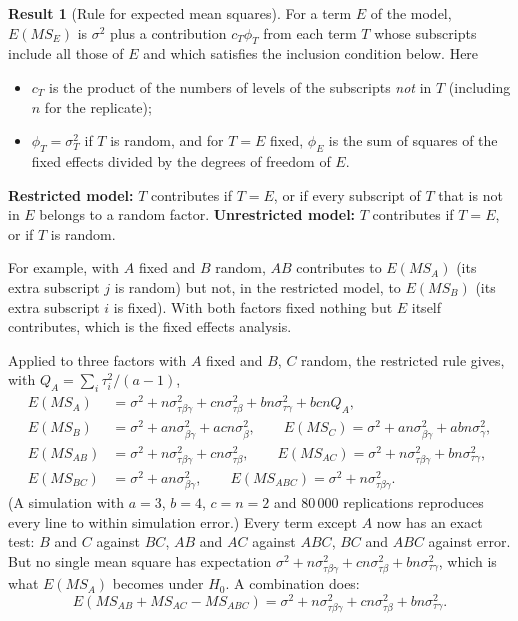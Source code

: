 \documentclass[11pt,a4paper]{article}
\numberwithin{equation}{section}
\theoremstyle{definition}
\newtheorem{result}[thm]{Result}
\begin{document}
\begin{result}[Rule for expected mean squares]\label{res:ems-rule}
For a term $E$ of the model, $E(MS_E)$ is $\sigma^2$ plus a contribution $c_T\phi_T$ from each term $T$ whose subscripts include all those of $E$ and which satisfies the
inclusion condition below. Here
\begin{itemize}
\item $c_T$ is the product of the numbers of levels of the subscripts \emph{not} in $T$ (including $n$ for the replicate);
\item $\phi_T = \sigma^2_T$ if $T$ is random, and for $T = E$ fixed, $\phi_E$ is the sum of squares of the fixed effects divided by the degrees of freedom of $E$.
\end{itemize}
\textbf{Restricted model:} $T$ contributes if $T = E$, or if every subscript of $T$ that is not in $E$ belongs to a random factor. \textbf{Unrestricted
model:} $T$ contributes if $T = E$, or if $T$ is random.
\end{result}

For example, with $A$ fixed and $B$ random, $AB$ contributes to $E(MS_A)$ (its extra subscript $j$ is random) but not, in the restricted model, to $E(MS_B)$ (its
extra subscript $i$ is fixed). With both factors fixed nothing but $E$ itself contributes, which is the fixed effects analysis.

Applied to three factors with $A$ fixed and $B$, $C$ random, the restricted rule gives, with $Q_A = \sum_i\tau_i^2/(a - 1)$,
\begin{align*}
E(MS_A) &= \sigma^2 + n\sigma^2_{\tau\beta\gamma} + cn\sigma^2_{\tau\beta} + bn\sigma^2_{\tau\gamma} + bcnQ_A , \\
E(MS_B) &= \sigma^2 + an\sigma^2_{\beta\gamma} + acn\sigma^2_\beta , \qquad E(MS_C) = \sigma^2 + an\sigma^2_{\beta\gamma} + abn\sigma^2_\gamma , \\
E(MS_{AB}) &= \sigma^2 + n\sigma^2_{\tau\beta\gamma} + cn\sigma^2_{\tau\beta} , \qquad E(MS_{AC}) = \sigma^2 + n\sigma^2_{\tau\beta\gamma} + bn\sigma^2_{\tau\gamma} , \\
E(MS_{BC}) &= \sigma^2 + an\sigma^2_{\beta\gamma} , \qquad E(MS_{ABC}) = \sigma^2 + n\sigma^2_{\tau\beta\gamma} .
\end{align*}
(A simulation with $a = 3$, $b = 4$, $c = n = 2$ and $80\,000$ replications reproduces every line to within simulation error.) Every term except $A$ now has an exact
test: $B$ and $C$ against $BC$, $AB$ and $AC$ against $ABC$, $BC$ and $ABC$ against error. But no single mean square has expectation
$\sigma^2 + n\sigma^2_{\tau\beta\gamma} + cn\sigma^2_{\tau\beta} + bn\sigma^2_{\tau\gamma}$, which is what $E(MS_A)$ becomes under $H_0$. A combination does:
\[
E(MS_{AB} + MS_{AC} - MS_{ABC}) = \sigma^2 + n\sigma^2_{\tau\beta\gamma} + cn\sigma^2_{\tau\beta} + bn\sigma^2_{\tau\gamma} .
\]
\end{document}
